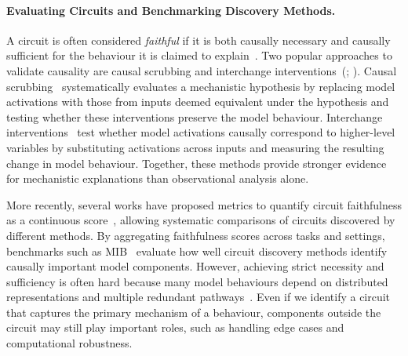 \paragraph{Evaluating Circuits and Benchmarking Discovery Methods.}
A circuit is often considered \emph{faithful} if it is both causally necessary and causally sufficient for the behaviour it is claimed to explain~. Two popular approaches to validate causality are causal scrubbing and interchange interventions~(; ). Causal scrubbing~ systematically evaluates a mechanistic hypothesis by replacing model activations with those from inputs deemed equivalent under the hypothesis and testing whether these interventions preserve the model behaviour. Interchange interventions~ test whether model activations causally correspond to higher-level variables by substituting activations across inputs and measuring the resulting change in model behaviour. Together, these methods provide stronger evidence for mechanistic explanations than observational analysis alone.

More recently, several works have proposed metrics to quantify circuit faithfulness as a continuous score~, allowing systematic comparisons of circuits discovered by different methods. By aggregating faithfulness scores across tasks and settings, benchmarks such as MIB~ evaluate how well circuit discovery methods identify causally important model components. However, achieving strict necessity and sufficiency is often hard because many model behaviours depend on distributed representations and multiple redundant pathways~. Even if we identify a circuit that captures the primary mechanism of a behaviour, components outside the circuit may still play important roles, such as handling edge cases and computational robustness.

